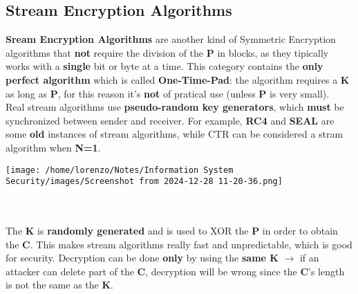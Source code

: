 \subsection{Stream Encryption Algorithms}
\begin{minipage}{0.6\textwidth}
\textbf{Sream Encryption Algorithms} are another kind of Symmetric Encryption algorithms that \textbf{not} require the division of the \textbf{P} in blocks, as they tipically works with a \textbf{single} bit or byte at a time. This category contains the \textbf{only perfect algorithm} which is called \textbf{One-Time-Pad}: the algorithm requires a \textbf{K} as long as \textbf{P}, for this reason it's \textbf{not} of pratical use (unless \textbf{P} is very small).\\Real stream algorithms use \textbf{pseudo-random key generators}, which \textbf{must} be synchronized between sender and receiver. For example, \textbf{RC4} and \textbf{SEAL} are some \textbf{old}
instances of stream algorithms, while CTR can be considered a stram algorithm when \textbf{N=1}.
\end{minipage} 
\hspace{0.3cm}
\begin{minipage}{0.4\textwidth}
    \centering
    \texttt{[image: /home/lorenzo/Notes/Information System Security/images/Screenshot from 2024-12-28 11-20-36.png]}
\end{minipage}
\noindent
\\
\\
The \textbf{K} is \textbf{randomly generated} and is used to XOR the \textbf{P} in order to obtain the \textbf{C}. This
makes stream algorithms really fast and unpredictable, which is good for security.
Decryption can be done \textbf{only} by using the \textbf{same K} \(\rightarrow \) if an attacker can delete part of the
\textbf{C}, decryption will be wrong since the \textbf{C}’s length is not the same as the \textbf{K}.
\noindent 
